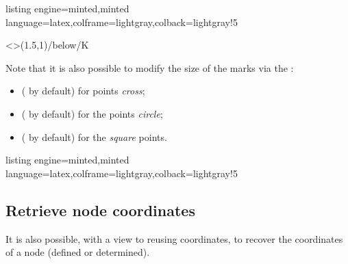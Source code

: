 \documentclass[11pt,a4paper]{ltxdoc}
\begin{document}
\begin{tcblisting}{listing engine=minted,minted language=latex,colframe=lightgray,colback=lightgray!5}
\begin{GraphTikz}[x=1.5cm,y=1.5cm,Ymin=-2]
	\MarkPts[Color=orange,Style=+]<\small\sffamily>{(1.5,1)/below/K} %
\end{GraphTikz}
\end{tcblisting}

Note that it is also possible to modify the size of the  marks via the \MontreCode{[keys]}:

\begin{itemize}
	\item {} (\MontreCode{2pt} by default) for points \textit{cross};
	\item {} (\MontreCode{1.75pt} by default) for the points \textit{circle};
	\item {} (\MontreCode{2pt} by default) for the \textit{square} points.
\end{itemize}

\begin{tcblisting}{listing engine=minted,minted language=latex,colframe=lightgray,colback=lightgray!5}
\begin{GraphTikz}[x=1cm,y=1cm,Xmin=0,Ymin=0]
\end{GraphTikz}
\end{tcblisting}

\subsection{Retrieve node coordinates}\label{recupcoordo}

It is also possible, with a view to reusing coordinates, to recover the coordinates of a node (defined or determined).
\end{document}
